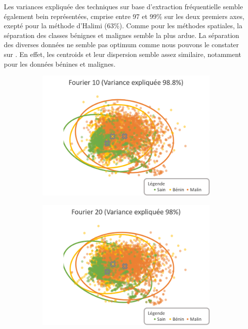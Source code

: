 Les variances expliquée des techniques sur base d'extraction fréquentielle semble également bein représentées, cmprise entre 97 et 99\% sur les deux premiers axes, exepté pour la méthode d'Halimi (63\%). Comme pour les méthodes spatiales, la séparation  des classes bénignes et malignes semble la plus ardue.
La séparation des diverses données ne semble pas optimum comme nous pouvons le constater sur . En effet, les centroids et leur dispersion semble assez similaire, notamment pour les données bénines et malignes.\par

\begin{figure}[H]
    \centering
    \begin{subfigure}{.45\textwidth}
      \includegraphics[width=\textwidth]{contents/chapter_4/resources/visualisation_frequency_Fourier10.png}
    \end{subfigure}
    \begin{subfigure}{.45\textwidth}
      \includegraphics[width=\textwidth]{contents/chapter_4/resources/visualisation_frequency_Fourier20.png}
    \end{subfigure}
    

\end{figure}
